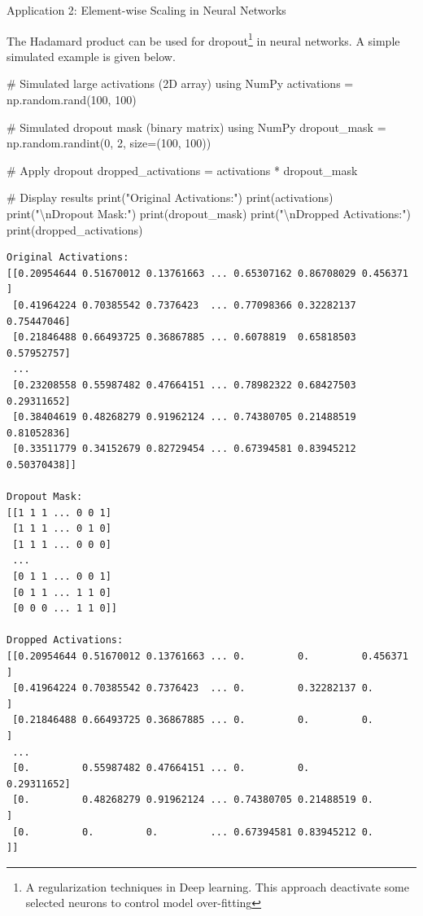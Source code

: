 \documentclass[
  letterpaper,
  DIV=11,
  numbers=noendperiod]{scrreprt}
\newenvironment{Shaded}{\begin{snugshade}}{\end{snugshade}}
\newcommand{\BuiltInTok}[1]{\textcolor[rgb]{0.00,0.23,0.31}{#1}}
\newcommand{\CharTok}[1]{\textcolor[rgb]{0.13,0.47,0.30}{#1}}
\newcommand{\CommentTok}[1]{\textcolor[rgb]{0.37,0.37,0.37}{#1}}
\newcommand{\DecValTok}[1]{\textcolor[rgb]{0.68,0.00,0.00}{#1}}
\newcommand{\NormalTok}[1]{\textcolor[rgb]{0.00,0.23,0.31}{#1}}
\newcommand{\OperatorTok}[1]{\textcolor[rgb]{0.37,0.37,0.37}{#1}}
\newcommand{\StringTok}[1]{\textcolor[rgb]{0.13,0.47,0.30}{#1}}
\theoremstyle{plain}
\theoremstyle{definition}
\theoremstyle{remark}
\begin{document}
Application 2: Element-wise Scaling in Neural Networks

The Hadamard product can be used for dropout\footnote{A regularization
  techniques in Deep learning. This approach deactivate some selected
  neurons to control model over-fitting} in neural networks. A simple
simulated example is given below.

\begin{Shaded}
\begin{Highlighting}[]
\CommentTok{\# Simulated large activations (2D array) using NumPy}
\NormalTok{activations }\OperatorTok{=}\NormalTok{ np.random.rand(}\DecValTok{100}\NormalTok{, }\DecValTok{100}\NormalTok{)}

\CommentTok{\# Simulated dropout mask (binary matrix) using NumPy}
\NormalTok{dropout\_mask }\OperatorTok{=}\NormalTok{ np.random.randint(}\DecValTok{0}\NormalTok{, }\DecValTok{2}\NormalTok{, size}\OperatorTok{=}\NormalTok{(}\DecValTok{100}\NormalTok{, }\DecValTok{100}\NormalTok{))}

\CommentTok{\# Apply dropout}
\NormalTok{dropped\_activations }\OperatorTok{=}\NormalTok{ activations }\OperatorTok{*}\NormalTok{ dropout\_mask}

\CommentTok{\# Display results}
\BuiltInTok{print}\NormalTok{(}\StringTok{"Original Activations:"}\NormalTok{)}
\BuiltInTok{print}\NormalTok{(activations)}
\BuiltInTok{print}\NormalTok{(}\StringTok{"}\CharTok{\textbackslash{}n}\StringTok{Dropout Mask:"}\NormalTok{)}
\BuiltInTok{print}\NormalTok{(dropout\_mask)}
\BuiltInTok{print}\NormalTok{(}\StringTok{"}\CharTok{\textbackslash{}n}\StringTok{Dropped Activations:"}\NormalTok{)}
\BuiltInTok{print}\NormalTok{(dropped\_activations)}
\end{Highlighting}
\end{Shaded}

\begin{verbatim}
Original Activations:
[[0.20954644 0.51670012 0.13761663 ... 0.65307162 0.86708029 0.456371  ]
 [0.41964224 0.70385542 0.7376423  ... 0.77098366 0.32282137 0.75447046]
 [0.21846488 0.66493725 0.36867885 ... 0.6078819  0.65818503 0.57952757]
 ...
 [0.23208558 0.55987482 0.47664151 ... 0.78982322 0.68427503 0.29311652]
 [0.38404619 0.48268279 0.91962124 ... 0.74380705 0.21488519 0.81052836]
 [0.33511779 0.34152679 0.82729454 ... 0.67394581 0.83945212 0.50370438]]

Dropout Mask:
[[1 1 1 ... 0 0 1]
 [1 1 1 ... 0 1 0]
 [1 1 1 ... 0 0 0]
 ...
 [0 1 1 ... 0 0 1]
 [0 1 1 ... 1 1 0]
 [0 0 0 ... 1 1 0]]

Dropped Activations:
[[0.20954644 0.51670012 0.13761663 ... 0.         0.         0.456371  ]
 [0.41964224 0.70385542 0.7376423  ... 0.         0.32282137 0.        ]
 [0.21846488 0.66493725 0.36867885 ... 0.         0.         0.        ]
 ...
 [0.         0.55987482 0.47664151 ... 0.         0.         0.29311652]
 [0.         0.48268279 0.91962124 ... 0.74380705 0.21488519 0.        ]
 [0.         0.         0.         ... 0.67394581 0.83945212 0.        ]]
\end{verbatim}
\end{document}
